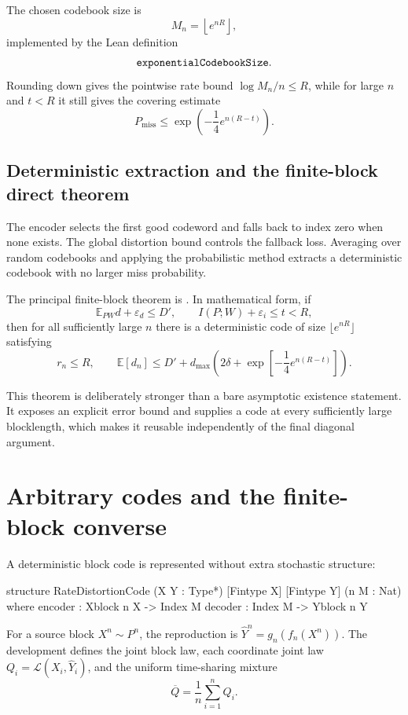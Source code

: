 \documentclass[11pt]{article}
\newcommand{\E}{\mathbb{E}}
\newcommand{\dmax}{d_{\max}}
\begin{document}
The chosen codebook size is
\[
  M_n=\left\lfloor e^{nR}\right\rfloor,
\]
implemented by the Lean definition
\[\texttt{exponential\allowbreak Codebook\allowbreak Size}.\]
Rounding down gives the pointwise rate bound $\log M_n/n\le R$, while for large $n$ and $t<R$ it still
gives the covering estimate
\[
  P_{\mathrm{miss}}
  \le \exp\!\left(-\frac14e^{n(R-t)}\right).
\]

\subsection{Deterministic extraction and the finite-block direct theorem}

The encoder selects the first good codeword and falls back to index zero when
none exists.  The global distortion bound controls the fallback loss.  Averaging
over random codebooks and applying the probabilistic method extracts a
deterministic codebook with no larger miss probability.

The principal finite-block theorem is
.
In mathematical form, if
\[
  \E_{PW}d+\varepsilon_d\le D',\qquad
  I(P;W)+\varepsilon_i\le t<R,
\]
then for all sufficiently large $n$ there is a deterministic code of size
$\lfloor e^{nR}\rfloor$ satisfying
\[
  r_n\le R,
  \qquad
  \E[d_n]\le D'+\dmax\left(
    2\delta+\exp\!\left[-\frac14e^{n(R-t)}\right]\right).
\]

This theorem is deliberately stronger than a bare asymptotic existence
statement.  It exposes an explicit error bound and supplies a code at every
sufficiently large blocklength, which makes it reusable independently of the
final diagonal argument.

\section{Arbitrary codes and the finite-block converse}

A deterministic block code is represented without extra stochastic structure:

\begin{LeanCode}
structure RateDistortionCode
    (X Y : Type*) [Fintype X] [Fintype Y] (n M : Nat) where
  encoder : Xblock n X -> Index M
  decoder : Index M -> Yblock n Y
\end{LeanCode}

For a source block $X^n\sim P^n$, the reproduction is
$\widehat Y^n=g_n(f_n(X^n))$.  The development defines the joint block law,
each coordinate joint law $Q_i=\mathcal L(X_i,\widehat Y_i)$, and the uniform
time-sharing mixture
\[
  \overline Q=\frac1n\sum_{i=1}^n Q_i.
\]
\end{document}
